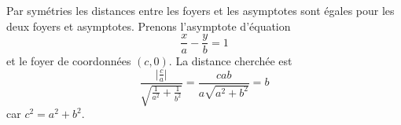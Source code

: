 Par symétries les distances entre les foyers et les asymptotes sont égales pour les deux foyers et asymptotes. Prenons l'asymptote d'équation
\begin{displaymath}
 \frac{x}{a}-\frac{y}{b}=1
\end{displaymath}
et le foyer de coordonnées $(c,0)$. La distance cherchée est
\begin{displaymath}
 \frac{\vert\frac{c}{a} \vert}{\sqrt{\frac{1}{a^2}+\frac{1}{b^2}}}
=\frac{cab}{a\sqrt{a^2+b^2}}=b
\end{displaymath}
car $c^2=a^2+b^2$.
